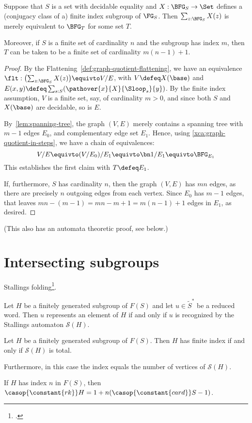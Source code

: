 \begin{theorem}
  Suppose that $S$ is a set with decidable equality and
  $X : \BFG_S \to \Set$ defines a (conjugacy class of a)
  finite index subgroup of $\FG_S$.
  Then $\sum_{z:\BFG_S}X(z)$ is merely equivalent to $\BFG_T$ for some set $T$.

  Moreover, if $S$ is a finite set of cardinality $n$ and the subgroup has index $m$,
  then $T$ can be taken to be a finite set of cardinality $m(n-1)+1$.
\end{theorem}
\begin{proof}
  By the Flattening~\cref{def:graph-quotient-flattening},
  we have an equivalence $\flt:\bigl(\sum_{z:\BFG_S}X(z)\bigr) \equivto V/E$,
  with $V\defeq X(\base)$ and $E(x,y) \defeq \sum_{s:S}(\pathover{x}{X}{\Sloop_s}{y})$.
  By the finite index assumption, $V$ is a finite set,
  say, of cardinality $m>0$,
  and since both $S$ and $X(\base)$ are decidable, so is $E$.

  By~\cref{lem:spanning-tree}, the graph $(V,E)$ merely contains
  a spanning tree with
  $m-1$ edges $E_0$, and complementary edge set $E_1$. Hence,
  using \cref{xca:graph-quotient-in-steps}, we have a chain of equivalences:
  \[
    V/E \equivto (V/E_0)/E_1
    \equivto \bn 1/E_1 \equivto \BFG_{E_1}
  \]
  This establishes the first claim with $T \defeq E_1$.

  If, furthermore, $S$ has cardinality $n$, then the graph $(V,E)$
  has $mn$ edges, as there are precisely $n$ outgoing edges from each vertex.
  Since $E_0$ has $m-1$ edges,
  that leaves $mn - (m-1) = mn-m+1 = m(n-1)+1$ edges in $E_1$, as desired.
\end{proof}
(This also has an automata theoretic proof, see below.)

\section{Intersecting subgroups}
\label{sec:intersecting-subgroups}

Stallings folding\footcite{Stallings1991}.

\begin{theorem}
  Let $H$ be a finitely generated subgroup of $F(S)$ and let $u\in\tilde S^*$
  be a reduced word. Then $u$ represents an element of $H$ if and only if
  $u$ is recognized by the Stallings automaton $\mathcal{S}(H)$.
\end{theorem}
\begin{theorem}
  Let $H$ be a finitely generated subgroup of $F(S)$.
  Then $H$ has finite index if and only if $\mathcal{S}(H)$ is total.

  Furthermore, in this case the index equals the number of vertices of
  $\mathcal{S}(H)$.
\end{theorem}
\begin{corollary}
  If $H$ has index $n$ in $F(S)$, then $\casop{\constant{rk}} H = 1 + n(\casop{\constant{card}} S-1)$.
\end{corollary}

